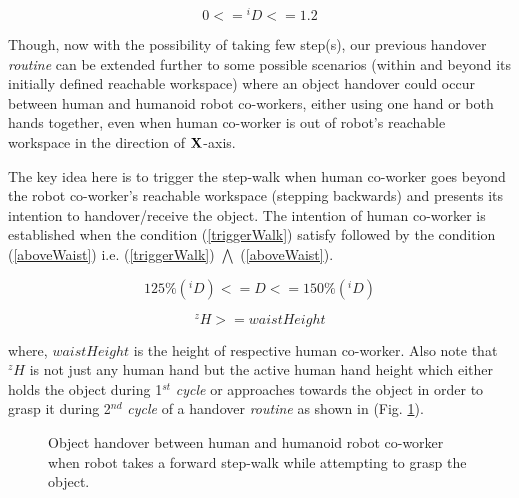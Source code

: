 \begin{equation}\label{Di_range}
	0 <= {}^{i}D <= 1.2
\end{equation}


Though, now with the possibility of taking few step(s), our previous handover \textit{routine} can be extended further to some possible scenarios (within and beyond its initially defined reachable workspace) where an object handover could occur between human and humanoid robot co-workers, either using one hand or both hands together, even when human co-worker is out of robot's reachable workspace in the direction of $\bf{X}$-axis. 

The key idea here is to trigger the step-walk when human co-worker goes beyond the robot co-worker's reachable workspace (stepping backwards) and presents its intention to handover/receive the object. The intention of human co-worker is established when the condition (\ref{triggerWalk}) satisfy followed by the condition (\ref{aboveWaist}) i.e.  (\ref{triggerWalk}) $\bigwedge$ (\ref{aboveWaist}).

\begin{equation}\label{triggerWalk}
		125\%({}^{i}D) <= D <= 150\%({}^{i}D)
\end{equation}

\begin{equation}\label{aboveWaist}
		{}^{z}H >= waistHeight
\end{equation}

where, $ waistHeight $ is the height of respective human co-worker. Also note that $ {}^{z}H $ is not just any human hand but the active human hand height which either holds the object during 1$ {}^{st} $ \textit{cycle} or approaches towards the object in order to grasp it during 2$ {}^{nd} $ \textit{cycle} of a handover \textit{routine} as shown in (Fig. \ref{fig:handoverWalk}).


\begin{figure}[hptb]
	\caption{Object handover between human and humanoid robot co-worker when robot takes a forward step-walk while attempting to grasp the object.}
	\label{fig:handoverWalk}
\end{figure}

